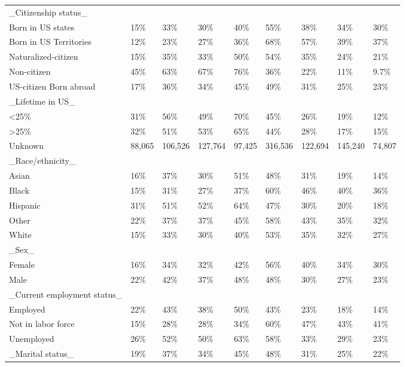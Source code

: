 \documentclass[
]{article}
\begin{document}
\begin{longtable}[t]{lllllllll}
\endfoot
\bottomrule
\endlastfoot
\_Citizenship status\_ &  &  &  &  &  &  &  & \\
Born in US states & 15\% & 33\% & 30\% & 40\% & 55\% & 38\% & 34\% & 30\%\\
Born in US Territories & 12\% & 23\% & 27\% & 36\% & 68\% & 57\% & 39\% & 37\%\\
Naturalized-citizen & 15\% & 35\% & 33\% & 50\% & 54\% & 35\% & 24\% & 21\%\\
Non-citizen & 45\% & 63\% & 67\% & 76\% & 36\% & 22\% & 11\% & 9.7\%\\
\addlinespace
US-citizen Born abroad & 17\% & 36\% & 34\% & 45\% & 49\% & 31\% & 25\% & 23\%\\
\_Lifetime in US\_ &  &  &  &  &  &  &  & \\
<25\% & 31\% & 56\% & 49\% & 70\% & 45\% & 26\% & 19\% & 12\%\\
>25\% & 32\% & 51\% & 53\% & 65\% & 44\% & 28\% & 17\% & 15\%\\
Unknown & 88,065 & 106,526 & 127,764 & 97,425 & 316,536 & 122,694 & 145,240 & 74,807\\
\addlinespace
\_Race/ethnicity\_ &  &  &  &  &  &  &  & \\
Asian & 16\% & 37\% & 30\% & 51\% & 48\% & 31\% & 19\% & 14\%\\
Black & 15\% & 31\% & 27\% & 37\% & 60\% & 46\% & 40\% & 36\%\\
Hispanic & 31\% & 51\% & 52\% & 64\% & 47\% & 30\% & 20\% & 18\%\\
Other & 22\% & 37\% & 37\% & 45\% & 58\% & 43\% & 35\% & 32\%\\
\addlinespace
White & 15\% & 33\% & 30\% & 40\% & 53\% & 35\% & 32\% & 27\%\\
\_Sex\_ &  &  &  &  &  &  &  & \\
Female & 16\% & 34\% & 32\% & 42\% & 56\% & 40\% & 34\% & 30\%\\
Male & 22\% & 42\% & 37\% & 48\% & 48\% & 30\% & 27\% & 23\%\\
\_Current employment status\_ &  &  &  &  &  &  &  & \\
\addlinespace
Employed & 22\% & 43\% & 38\% & 50\% & 43\% & 23\% & 18\% & 14\%\\
Not in labor force & 15\% & 28\% & 28\% & 34\% & 60\% & 47\% & 43\% & 41\%\\
Unemployed & 26\% & 52\% & 50\% & 63\% & 58\% & 33\% & 29\% & 23\%\\
\_Marital status\_ & 19\% & 37\% & 34\% & 45\% & 48\% & 31\% & 25\% & 22\%\\

\end{longtable}
\end{document}
